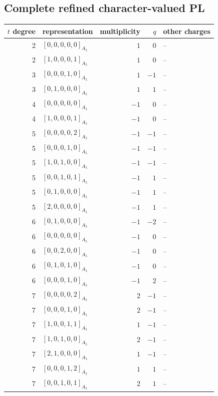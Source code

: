 \documentclass[11pt]{article}
\newcommand{\Dynkin}[1]{#1}
\begin{document}
\subsection{Complete refined character-valued PL}
\begin{longtable}{r l r r l}
\toprule $t$ degree & representation & multiplicity & $q$ & other charges\\\midrule\endhead
2 & $\Dynkin{[0,0,0,0,0]_{A_5}}$ & $1$ & $0$ & --\\
2 & $\Dynkin{[1,0,0,0,1]_{A_5}}$ & $1$ & $0$ & --\\
3 & $\Dynkin{[0,0,0,1,0]_{A_5}}$ & $1$ & $-1$ & --\\
3 & $\Dynkin{[0,1,0,0,0]_{A_5}}$ & $1$ & $1$ & --\\
4 & $\Dynkin{[0,0,0,0,0]_{A_5}}$ & $-1$ & $0$ & --\\
4 & $\Dynkin{[1,0,0,0,1]_{A_5}}$ & $-1$ & $0$ & --\\
5 & $\Dynkin{[0,0,0,0,2]_{A_5}}$ & $-1$ & $-1$ & --\\
5 & $\Dynkin{[0,0,0,1,0]_{A_5}}$ & $-1$ & $-1$ & --\\
5 & $\Dynkin{[1,0,1,0,0]_{A_5}}$ & $-1$ & $-1$ & --\\
5 & $\Dynkin{[0,0,1,0,1]_{A_5}}$ & $-1$ & $1$ & --\\
5 & $\Dynkin{[0,1,0,0,0]_{A_5}}$ & $-1$ & $1$ & --\\
5 & $\Dynkin{[2,0,0,0,0]_{A_5}}$ & $-1$ & $1$ & --\\
6 & $\Dynkin{[0,1,0,0,0]_{A_5}}$ & $-1$ & $-2$ & --\\
6 & $\Dynkin{[0,0,0,0,0]_{A_5}}$ & $-1$ & $0$ & --\\
6 & $\Dynkin{[0,0,2,0,0]_{A_5}}$ & $-1$ & $0$ & --\\
6 & $\Dynkin{[0,1,0,1,0]_{A_5}}$ & $-1$ & $0$ & --\\
6 & $\Dynkin{[0,0,0,1,0]_{A_5}}$ & $-1$ & $2$ & --\\
7 & $\Dynkin{[0,0,0,0,2]_{A_5}}$ & $2$ & $-1$ & --\\
7 & $\Dynkin{[0,0,0,1,0]_{A_5}}$ & $2$ & $-1$ & --\\
7 & $\Dynkin{[1,0,0,1,1]_{A_5}}$ & $1$ & $-1$ & --\\
7 & $\Dynkin{[1,0,1,0,0]_{A_5}}$ & $2$ & $-1$ & --\\
7 & $\Dynkin{[2,1,0,0,0]_{A_5}}$ & $1$ & $-1$ & --\\
7 & $\Dynkin{[0,0,0,1,2]_{A_5}}$ & $1$ & $1$ & --\\
7 & $\Dynkin{[0,0,1,0,1]_{A_5}}$ & $2$ & $1$ & --\\

\end{longtable}
\end{document}
